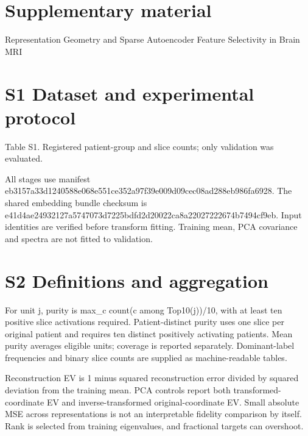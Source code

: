 \documentclass[10pt]{article}
\begin{document}
\section*{Supplementary material}
Representation Geometry and Sparse Autoencoder Feature Selectivity in Brain MRI

\section*{S1  Dataset and experimental protocol}
\begin{center}
\par\small Table S1. Registered patient-group and slice counts; only validation was evaluated.
\end{center}
All stages use manifest eb3157a33d1240588e068e551ce352a97f39e009d09cec08ad288eb986fa6928. The shared embedding bundle checksum is e41d4ae24932127a5747073d7225bdfd2d20022ca8a22027222674b7494cf9eb. Input identities are verified before transform fitting. Training mean, PCA covariance and spectra are not fitted to validation.

\section*{S2  Definitions and aggregation}
For unit j, purity is max\_c count(c among Top10(j))/10, with at least ten positive slice activations required. Patient-distinct purity uses one slice per original patient and requires ten distinct positively activating patients. Mean purity averages eligible units; coverage is reported separately. Dominant-label frequencies and binary slice counts are supplied as machine-readable tables.

Reconstruction EV is 1 minus squared reconstruction error divided by squared deviation from the training mean. PCA controls report both transformed-coordinate EV and inverse-transformed original-coordinate EV. Small absolute MSE across representations is not an interpretable fidelity comparison by itself. Rank is selected from training eigenvalues, and fractional targets can overshoot.
\end{document}

